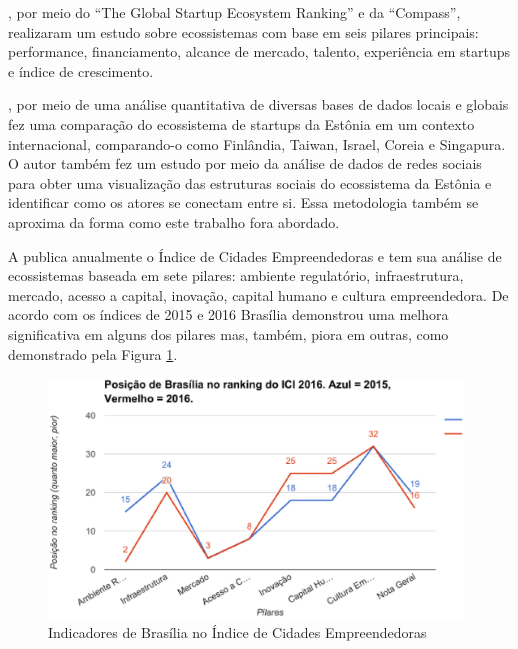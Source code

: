 , por meio do ``The Global Startup Ecosystem Ranking'' e da ``Compass'', realizaram um estudo sobre ecossistemas com base em seis pilares principais: performance, financiamento, alcance de mercado, talento, experiência em startups e índice de crescimento. 

, por meio de uma análise quantitativa de diversas bases de dados locais e globais fez uma comparação do ecossistema de startups da Estônia em um contexto internacional, comparando-o como Finlândia, Taiwan, Israel, Coreia e Singapura. O autor também fez um estudo por meio da análise de dados de redes sociais para obter uma visualização das estruturas sociais do ecossistema da Estônia e identificar como os atores se conectam entre si. Essa metodologia também se aproxima da forma como este trabalho fora abordado.

A  publica anualmente o Índice de Cidades Empreendedoras e tem sua análise de ecossistemas baseada em sete pilares: ambiente regulatório, infraestrutura, mercado, acesso a capital, inovação, capital humano e cultura empreendedora. De acordo com os índices de 2015 e 2016 Brasília demonstrou uma melhora significativa em alguns dos pilares mas, também, piora em outras, como demonstrado pela Figura \ref{figure:ici20152016}. 

\begin{figure}[!htb]
	\centering
	\includegraphics[width=11cm,angle=0]{figuras/ici20152016}
	\caption{Indicadores de Brasília no Índice de Cidades Empreendedoras}
	\label{figure:ici20152016}
\end{figure}


